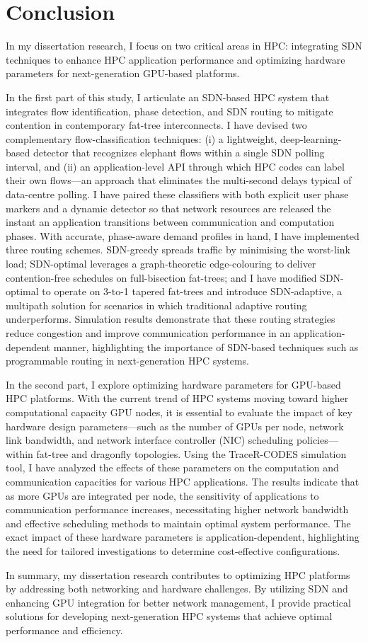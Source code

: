 \chapter{Conclusion}
In my dissertation research, I focus on two critical areas in HPC: integrating SDN techniques to enhance HPC application performance and optimizing hardware parameters for next-generation GPU-based platforms.

In the first part of this study, I articulate an SDN-based HPC system that integrates flow identification, phase detection, and SDN routing to mitigate contention in contemporary fat-tree interconnects. I have devised two complementary flow-classification techniques: (i) a lightweight, deep-learning-based detector that recognizes elephant flows within a single SDN polling interval, and (ii) an application-level API through which HPC codes can label their own flows—an approach that eliminates the multi-second delays typical of data-centre polling. I have paired these classifiers with both explicit user phase markers and a dynamic detector so that network resources are released the instant an application transitions between communication and computation phases. With accurate, phase-aware demand profiles in hand, I have implemented three routing schemes. SDN-greedy spreads traffic by minimising the worst-link load; SDN-optimal leverages a graph-theoretic edge-colouring to deliver contention-free schedules on full-bisection fat-trees; and I have modified SDN-optimal to operate on 3-to-1 tapered fat-trees and introduce SDN-adaptive, a multipath solution for scenarios in which traditional adaptive routing underperforms. Simulation results demonstrate that these routing strategies reduce congestion and improve communication performance in an application-dependent manner, highlighting the importance of SDN-based techniques such as programmable routing in next-generation HPC systems.

In the second part, I explore optimizing hardware parameters for GPU-based HPC platforms. With the current trend of HPC systems moving toward higher computational capacity GPU nodes, it is essential to evaluate the impact of key hardware design parameters—such as the number of GPUs per node, network link bandwidth, and network interface controller (NIC) scheduling policies—within fat-tree and dragonfly topologies. Using the TraceR-CODES simulation tool, I have analyzed the effects of these parameters on the computation and communication capacities for various HPC applications. The results indicate that as more GPUs are integrated per node, the sensitivity of applications to communication performance increases, necessitating higher network bandwidth and effective scheduling methods to maintain optimal system performance. The exact impact of these hardware parameters is application-dependent, highlighting the need for tailored investigations to determine cost-effective configurations.

In summary, my dissertation research contributes to optimizing HPC platforms by addressing both networking and hardware challenges. By utilizing SDN and enhancing GPU integration for better network management, I provide practical solutions for developing next-generation HPC systems that achieve optimal performance and efficiency.
